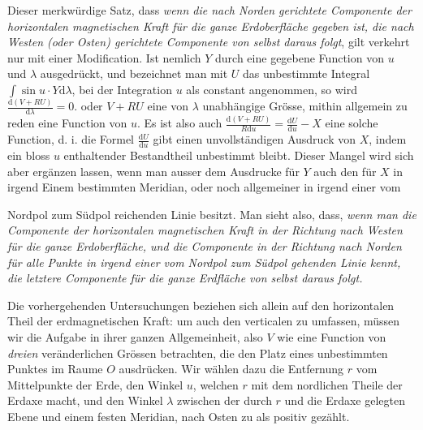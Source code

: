 Dieser merkwürdige Satz, dass \textit{wenn die nach Norden gerichtete Componente der horizontalen magnetischen Kraft für die ganze Erdoberfläche gegeben ist, die nach Westen (oder Osten) gerichtete Componente von selbst daraus folgt}, gilt verkehrt nur mit einer Modification. Ist nemlich $Y$ durch eine gegebene Function von $u$ und $\lambda$ ausgedrückt, und bezeichnet man mit $U$ das unbestimmte Integral $\int\sin u\cdot Y\mathrm{d}\lambda$, bei der Integration $u$ als constant angenommen, so wird $\frac{\mathrm{d}(V+RU)}{\mathrm{d}\lambda}=0$. oder $V+RU$ eine von $\lambda$ unabhängige Grösse, mithin allgemein zu reden eine Function von $u$. Es ist also auch $\frac{\mathrm{d}(V+RU)}{R\mathrm{d}u}=\frac{\mathrm{d}U}{\mathrm{d}u}-X$ eine solche Function, d. i. die Formel $\frac{\mathrm{d}U}{\mathrm{d}u}$ gibt einen unvollständigen Ausdruck von $X$, indem ein bloss $u$ enthaltender Bestandtheil unbestimmt bleibt. Dieser Mangel wird sich aber ergänzen lassen, wenn man ausser dem Ausdrucke für $Y$ auch den für $X$ in irgend Einem bestimmten Meridian, oder noch allgemeiner in irgend einer vom\par\GaussVTheoryGathering{18\textsuperscript{*}}
\par\clearpage
{}
\noindent Nordpol zum Südpol reichenden Linie besitzt. Man sieht also, dass, \textit{wenn man die Componente der horizontalen magnetischen Kraft in der Richtung nach Westen für die ganze Erdoberfläche, und die Componente in der Richtung nach Norden für alle Punkte in irgend einer vom Nordpol zum Südpol gehenden Linie kennt, die letztere Componente für die ganze Erdfläche von selbst daraus folgt.}

Die vorhergehenden Untersuchungen beziehen sich allein auf den horizontalen Theil der erdmagnetischen Kraft: um auch den verticalen zu umfassen, müssen wir die Aufgabe in ihrer ganzen Allgemeinheit, also $V$ wie eine Function von \textit{dreien} veränderlichen Grössen betrachten, die den Platz eines unbestimmten Punktes im Raume $O$ ausdrücken. Wir wählen dazu die Entfernung $r$ vom Mittelpunkte der Erde, den Winkel $u$, welchen $r$ mit dem nordlichen Theile der Erdaxe macht, und den Winkel $\lambda$ zwischen der durch $r$ und die Erdaxe gelegten Ebene und einem festen Meridian, nach Osten zu als positiv gezählt.

